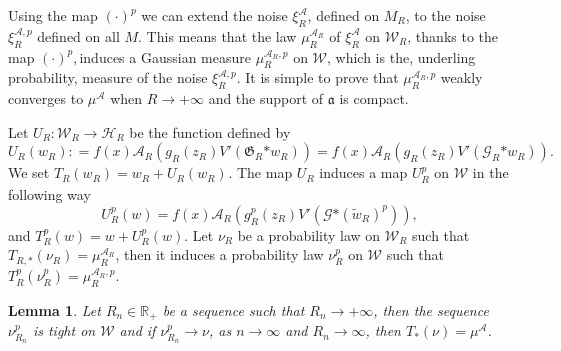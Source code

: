 \documentclass[a4paper,10pt]{article}
\newcommand{\asterisk}{\mathord{*}}
\newtheorem{lemma}[theorem]{Lemma}
\begin{document}
Using the map $(\cdot)^p$ we can extend the noise $\xi^{\mathcal{A}}_R$,
defined on $M_R$, to the noise $\xi^{\mathcal{A}, p}_R$ defined on all $M$.
This means that the law $\mu^{\mathcal{A}_R}_R$ of $\xi^{\mathcal{A}}_R$ on
$\mathcal{W}_R$, thanks to the map $(\cdot)^p,$induces a Gaussian measure
$\mu^{\mathcal{A}_R, p}_R$ on $\mathcal{W}$, which is the, underling
probability, measure of the noise $\xi^{\mathcal{A}, p}_R$. It is simple to
prove that $\mu^{\mathcal{A}_R, p}_R$ weakly converges to $\mu^{\mathcal{A}}$
when $R \rightarrow + \infty$ and the support of $\mathfrak{a}$ is compact.

Let $U_R : \mathcal{W}_R \rightarrow \mathcal{H}_R$ be the function defined
by
\[ U_R (w_R) : = f (x) \mathcal{A}_R (g_R (z_R) V' (\mathfrak{G}_R \asterisk
   w_R)) = f (x) \mathcal{A}_R (g_R (z_R) V' (\mathcal{G}_R \asterisk w_R)) .
\]
We set $T_R (w_R) = w_R + U_R (w_R)_{}$. The map $U_R$ induces a map $U_R^p$
on $\mathcal{W}$ in the following way
\[ U_R^p (w) = f (x) \mathcal{A}_R (g_R^p (z_R) V' (\mathcal{G} \asterisk
   (\tilde{w}_R)^p)), \]
and $T^p_R (w) = w + U^p_R (w)$. Let $\nu_R$ be a probability law on
$\mathcal{W}_R$ such that $T_{R, \asterisk} (\nu_R) = \mu^{\mathcal{A}_R}_R$,
then it induces a probability law $\nu^p_R$ on $\mathcal{W}$ such that $T^p_R
(\nu_R^p) = \mu^{\mathcal{A}_R, p}_R$.

\begin{lemma}
  \label{lemma_extension1}Let $R_n \in \mathbb{R}_+$ be a sequence such that
  $R_n \rightarrow + \infty$, then the sequence $\nu_{R_n}^p$ is tight on
  $\mathcal{W}$ and if $\nu_{R_n}^p \rightarrow \nu$, as $n \rightarrow
  \infty$ and $R_n \rightarrow \infty$, then $T_{\asterisk} (\nu) =
  \mu^{\mathcal{A}}$.
\end{lemma}
\end{document}
